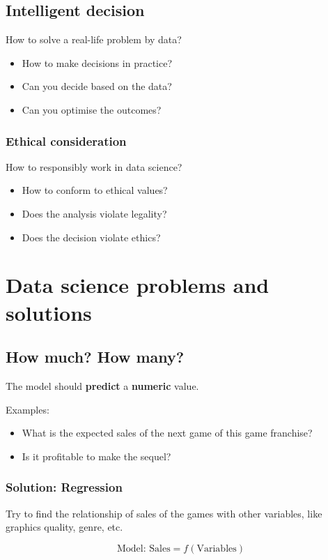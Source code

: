 \documentclass[11pt]{article}
\begin{document}
\subsection{Intelligent decision}
\label{sec:orgce37a29}
How to solve a real-life problem by data?
\begin{itemize}
\item How to make decisions in practice?
\item Can you decide based on the data?
\item Can you optimise the outcomes?
\end{itemize}
\subsubsection{Ethical consideration}
\label{sec:org9d87b25}
How to responsibly work in data science?
\begin{itemize}
\item How to conform to ethical values?
\item Does the analysis violate legality?
\item Does the decision violate ethics?
\end{itemize}

 \newpage
\section{Data science problems and solutions}
\label{sec:orgb8214e9}

\subsection{How much? How many?}
\label{sec:org93924ab}
The model should \textbf{predict} a \textbf{numeric} value.

Examples:
\begin{itemize}
\item What is the expected sales of the next game of this game franchise?
\item Is it profitable to make the sequel?
\end{itemize}
\subsubsection{Solution: Regression}
\label{sec:orgc4e2809}
Try to find the relationship of sales of the games with other variables, like graphics quality, genre, etc.

\[\text{Model: } \text{Sales} = f(\text{Variables})\]
\end{document}
